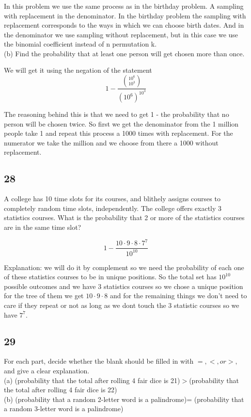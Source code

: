 \documentclass{article}
\begin{document}
In this problem we use the same process as in the birthday problem. A sampling with replacement in the denominator. In the birthday problem the sampling with replacement corresponds to the ways in which we can choose birth dates. And in the denominator we use sampling without replacement, but in this case we use the binomial coefficient instead of n permutation k.
\\
(b) Find the probability that at least one person will get chosen more than once.

We will get it using the negation of the statement
$$1- \frac{\binom{10^6}{10^3}}{(10^6)^{10^3}}$$

The reasoning behind this is that we need to get 1 - the probability that no person will be chosen twice. So first we get the denominator from the 1 million people take 1 and repeat this process a 1000 times with replacement. For the numerator we take the million and we choose from there a 1000 without replacement.
\subsection{28}
A college has 10 time slots for its courses, and blithely assigns courses to completely random time slots, independently. The college oﬀers exactly 3 statistics courses. What is the probability that 2 or more of the statistics courses are in the same time slot? 

$$1 - \frac{10 \cdot 9 \cdot 8 \cdot 7^7}{10^{10}}$$

Explanation: we will do it by complement so we need the probability of each one of these statistics courses to be in unique positions. So the total set has $10^10$ possible outcomes and we have 3 statistics courses so we chose a unique position for the tree of them we get  $10 \cdot 9 \cdot 8$ and for the remaining things we don't need to care if they repeat or not as long as we dont touch the 3 statistic courses so we have $7^7$.
\subsection{29}
For each part, decide whether the blank should be ﬁlled in with $=, <, or >,$ and give a clear explanation.\\
(a) (probability that the total after rolling 4 fair dice is 21)$>$(probability that the total after rolling 4 fair dice is 22)\\
(b) (probability that a random 2-letter word is a palindrome)= (probability that a random 3-letter word is a palindrome)
\end{document}
